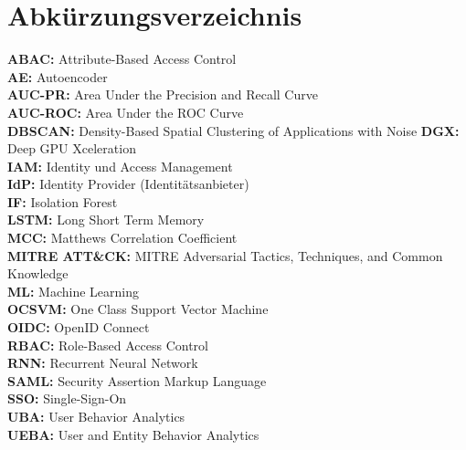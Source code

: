 \documentclass[a4paper,12pt]{article}
\begin{document}
	\section*{Abkürzungsverzeichnis}
	
	\textbf{ABAC:} Attribute-Based Access Control \\[1em]
	\textbf{AE:} Autoencoder \\[1em]
	\textbf{AUC-PR:} Area Under the Precision and Recall Curve \\[1em]
	\textbf{AUC-ROC:} Area Under the ROC Curve \\[1em]
	\textbf{DBSCAN:} Density-Based Spatial Clustering of Applications with Noise
	\textbf{DGX:} Deep GPU Xceleration \\[1em]
	\textbf{IAM:} Identity und Access Management \\[1em]
	\textbf{IdP:} Identity Provider (Identitätsanbieter) \\[1em]
	\textbf{IF:} Isolation Forest \\[1em]
	\textbf{LSTM:} Long Short Term Memory \\[1em]
	\textbf{MCC:} Matthews Correlation Coefficient \\[1em]
	\textbf{MITRE ATT\&CK: } MITRE Adversarial Tactics, Techniques, 
		and Common Knowledge \\[1em]
	\textbf{ML:} Machine Learning \\[1em]
	\textbf{OCSVM:} One Class Support Vector Machine \\[1em]
	\textbf{OIDC:} OpenID Connect \\[1em]
	\textbf{RBAC:} Role-Based Access Control \\[1em]
	\textbf{RNN:} Recurrent Neural Network \\[1em]
	\textbf{SAML:} Security Assertion Markup Language \\[1em]
	\textbf{SSO:} Single-Sign-On \\[1em]
	\textbf {UBA:} User Behavior Analytics \\[1em]
	\textbf {UEBA:} User and Entity Behavior Analytics \\[1em]
	
	
	\newpage
	
	
	
	
\end{document}
